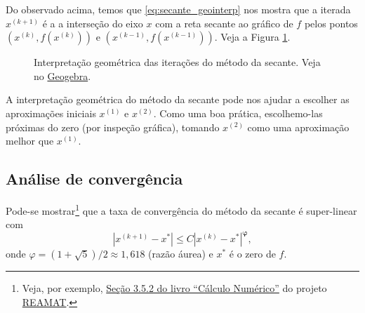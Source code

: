 Do observado acima, temos que \eqref{eq:secante_geointerp} nos mostra que a iterada $x^{(k+1)}$ é a a interseção do eixo $x$ com a reta secante ao gráfico de $f$ pelos pontos $(x^{(k)}, f(x^{(k)}))$ e $(x^{(k-1)}, f(x^{(k-1)}))$. Veja a Figura \ref{fig:secante_geointerp}.


\begin{figure}[h!]
  \centering
  \caption{Interpretação geométrica das iterações do método da secante. Veja no \href{https://github.com/phkonzen/notas/blob/master/src/MatematicaNumerica/cap_eq1d/dados/fig_secante_geointerp/fig_secante_geointerp.ggb}{Geogebra}.}
  \label{fig:secante_geointerp}
\end{figure}


\begin{obs}
  A interpretação geométrica do método da secante pode nos ajudar a escolher as aproximações iniciais $x^{(1)}$ e $x^{(2)}$. Como uma boa prática, escolhemo-las próximas do zero (por inspeção gráfica), tomando $x^{(2)}$ como uma aproximação melhor que $x^{(1)}$. 
\end{obs}

\subsection{Análise de convergência}

Pode-se mostrar\footnote{Veja, por exemplo, \href{https://www.ufrgs.br/reamat/CalculoNumerico/livro-oct/sdeduv-metodo_das_secantes.html}{Seção 3.5.2 do livro ``Cálculo Numérico''} do projeto \href{https://www.ufrgs.br/reamat}{REAMAT}.} que a taxa de convergência do método da secante é super-linear com
\begin{equation}
  |x^{(k+1)}-x^*| \leq C|x^{(k)}-x^*|^{\pmb{\varphi}},
\end{equation}
onde $\varphi = (1+\sqrt{5})/2\approx 1,618$ (razão áurea) e $x^*$ é o zero de $f$.



